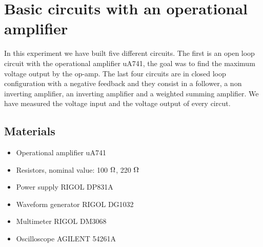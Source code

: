 \chapter{Basic circuits with an operational amplifier}
In this experiment we have built five different circuits. The first is an open loop circuit with the operational amplifier uA741, the goal was to find the maximum voltage output by the op-amp. The last four circuits are in closed loop configuration with a negative feedback and they consist in a follower, a non inverting amplifier, an inverting amplifier and a weighted summing amplifier. We have measured the voltage input and the voltage output of every circut.
\section{Materials}
\begin{itemize}
\item Operational amplifier uA741
\item Resistors, nominal value: 100 $\ohm$, 220 $\ohm$
\item Power supply RIGOL DP831A
\item Waveform generator RIGOL DG1032
\item Multimeter RIGOL DM3068
\item Oscilloscope AGILENT 54261A
\end{itemize}
